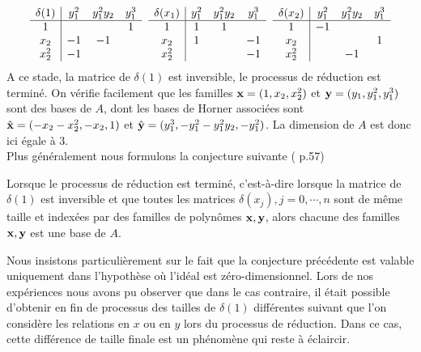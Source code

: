 \documentclass{standalone}
\begin{document}
  $$
  \begin{array}{c|ccc}
  	\delta(1) & y_1^2 & y_1^2y_2 & y_1^3 \\
  	\hline
  	1  &  &  & 1 \\
  	x_2  & -1 & -1 & \\
  	x_2^2 & -1 &  &
  \end{array}
  \hspace{0.2cm}
  \begin{array}{c|ccc}
  	\delta(x_1) & y_1^2 & y_1^2y_2 & y_1^3 \\
  	\hline
  	1  & 1 & 1 & \\
  	x_2  & 1 &  & -1\\
  	x_2^2  &  &  & -1
  \end{array}
  \hspace{0.2cm}
  \begin{array}{c|ccc}
  	\delta(x_2) & y_1^2 & y_1^2y_2 & y_1^3 \\
  	\hline
  	1  & -1 &  & \\
  	x_2  &  &  & 1 \\
  	x_2^2  &  & -1 &
  \end{array}
  $$
  A ce stade, la matrice de $\delta(1)$ est inversible, le processus de réduction est terminé. On vérifie facilement que les familles $\bold{x} = (1, x_2, x_2^{2})$ et $\bold{y} = (y_1, y_1^{2}, y_1^{3})$ sont des bases de $A$, dont les bases de Horner associées sont $\hat{\bold{x}} = (-x_2-x_2^{2}, -x_{2}, 1)$ et $\hat{\bold{y}} = (y_1^{3}, -y_1^{2}-y_1^{2}y_2, -y_1^{2})$. La dimension de $A$ est donc ici égale à $3$.\\

  Plus généralement nous formulons la conjecture suivante (\cite{jpc} p.57)
  \begin{conj}
  Lorsque le processus de réduction est terminé, c'est-à-dire lorsque la matrice de $\delta(1)$ est inversible et que toutes les matrices $\delta(x_j), j=0, \cdots, n$ sont de même taille et indexées par des familles de polynômes $\bold{x, y}$, alors chacune des familles $\bold{x, y}$ est une base de $A$.
  \end{conj}

  \begin{rem}
  Nous insistons particulièrement sur le fait que la conjecture précédente est valable uniquement dans l'hypothèse où l'idéal est zéro-dimensionnel. Lors de nos expériences nous avons pu observer que dans le cas contraire, il était possible d'obtenir en fin de processus des tailles de $\delta(1)$ différentes suivant que l'on considère les relations en $x$ ou en $y$ lors du processus de réduction. Dans ce cas, cette différence de taille finale est un phénomène qui reste à éclaircir.
  \end{rem}
\end{document}
